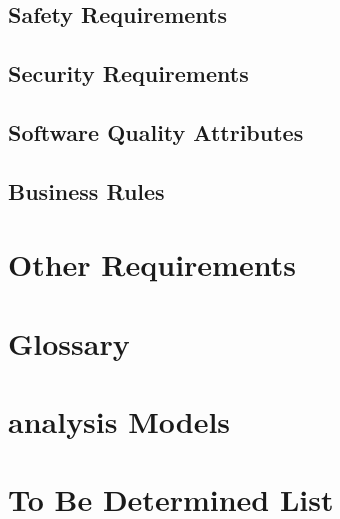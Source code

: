 \section{Safety Requirements}
\section{Security Requirements}
\section{Software Quality Attributes}
\section{Business Rules}

\chapter{Other Requirements}
\label{Other Requirements}

\begin{appendices}
\chapter{Glossary}
\chapter{analysis Models}
\chapter{To Be Determined List}


\end{appendices}


